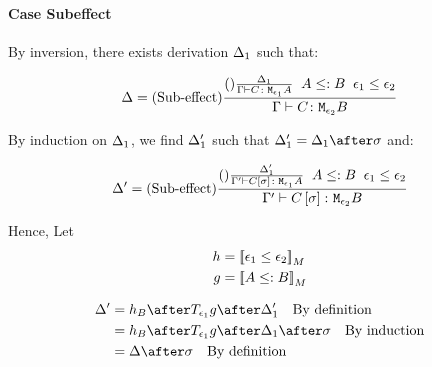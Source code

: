 \documentclass{report}
\begin{document}
\paragraph{Case Subeffect}

By inversion, there exists derivation $\Delta_1$ such that:

\begin{equation}
    \Delta = (\text{Sub-effect}) \frac{(\text{}) \frac{\Delta_1}{\Gamma \vdash C \colon \texttt{M}_{\epsilon_1}{A}}\;\; A\leq: B\;\; \epsilon_1\leq\epsilon_2}{\Gamma \vdash C \colon \texttt{M}_{\epsilon_2}{B}}
\end{equation}

By induction on $\Delta_1$, we find $\Delta_1'$ such that $\D_1' = \D_1\after\si$ and:

\begin{equation}
    \Delta' = (\text{Sub-effect}) \frac{(\text{}) \frac{\Delta_1'}{\Gamma' \vdash C\left[\sigma\right] \colon \texttt{M}_{\epsilon_1}{A}}\;\; A\leq: B\;\; \epsilon_1\leq\epsilon_2}{\Gamma' \vdash C\left[\sigma\right] \colon \texttt{M}_{\epsilon_2}{B}}
\end{equation}

Hence,
Let
\begin{align}
    h &= {\bf [\![}\epsilon_1\leq\epsilon_2{\bf ]\!]}_M\\
    g &= {\bf [\![}A\leq: B{\bf ]\!]}_M
\end{align}

\begin{align}
    \D' &= h_B\after\T{\e_1}{g}\after\D_1'\qt{By definition}\\
        &= h_B\after\T{\e_1}{g}\after\D_1\after\si\qt{By induction}\\
        &= \D\after\si\qt{By definition}\\
\end{align}
\end{document}
